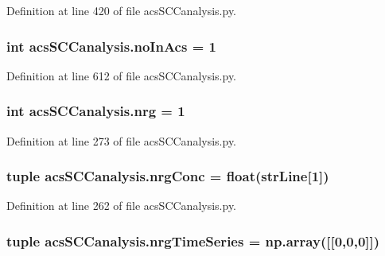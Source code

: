 Definition at line 420 of file acs\-S\-C\-Canalysis.\-py.

\hypertarget{a00102_a4766b3ca835449f1aa287fda699c7f96}{
\subsubsection[{no\-In\-Acs}]{\setlength{\rightskip}{0pt plus 5cm}int acs\-S\-C\-Canalysis.\-no\-In\-Acs = 1}}\label{a00102_a4766b3ca835449f1aa287fda699c7f96}


Definition at line 612 of file acs\-S\-C\-Canalysis.\-py.

\hypertarget{a00102_a948683f966c62ac856582281c3cda1f4}{
\subsubsection[{nrg}]{\setlength{\rightskip}{0pt plus 5cm}int acs\-S\-C\-Canalysis.\-nrg = 1}}\label{a00102_a948683f966c62ac856582281c3cda1f4}


Definition at line 273 of file acs\-S\-C\-Canalysis.\-py.

\hypertarget{a00102_a24d5f5a61d56c596017396ad272ef4a4}{
\subsubsection[{nrg\-Conc}]{\setlength{\rightskip}{0pt plus 5cm}tuple acs\-S\-C\-Canalysis.\-nrg\-Conc = float({\bf str\-Line}\mbox{[}1\mbox{]})}}\label{a00102_a24d5f5a61d56c596017396ad272ef4a4}


Definition at line 262 of file acs\-S\-C\-Canalysis.\-py.

\hypertarget{a00102_ad4d4abc783f2f7f8d1084b1144b4fe2f}{
\subsubsection[{nrg\-Time\-Series}]{\setlength{\rightskip}{0pt plus 5cm}tuple acs\-S\-C\-Canalysis.\-nrg\-Time\-Series = np.\-array(\mbox{[}\mbox{[}0,0,0\mbox{]}\mbox{]})}}\label{a00102_ad4d4abc783f2f7f8d1084b1144b4fe2f}


